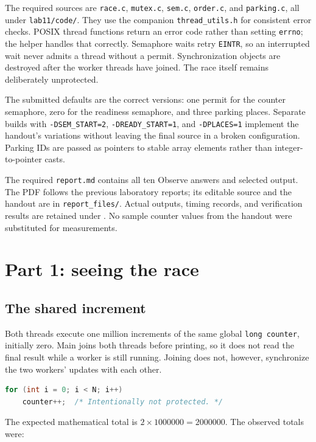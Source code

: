 \documentclass[12pt]{article}
\begin{document}
The required sources are \texttt{race.c}, \texttt{mutex.c}, \texttt{sem.c},
\texttt{order.c}, and \texttt{parking.c}, all under \texttt{lab11/code/}.
They use the companion \texttt{thread\_utils.h} for consistent error
checks. POSIX thread functions return an error code rather than setting
\texttt{errno}; the helper handles that correctly. Semaphore waits retry
\texttt{EINTR}, so an interrupted wait never admits a thread without a
permit. Synchronization objects are destroyed after the worker threads
have joined. The race itself remains deliberately unprotected.

The submitted defaults are the correct versions: one permit for the
counter semaphore, zero for the readiness semaphore, and three parking
places. Separate builds with \texttt{-DSEM\_START=2},
\texttt{-DREADY\_START=1}, and \texttt{-DPLACES=1} implement the handout's
variations without leaving the final source in a broken configuration.
Parking IDs are passed as pointers to stable array elements rather than
integer-to-pointer casts.

The required \texttt{report.md} contains all ten Observe answers and
selected output. The PDF follows the previous laboratory reports; its
editable source and the handout are in \texttt{report\_files/}. Actual
outputs, timing records, and verification results are retained under
. No sample counter values from the
handout were substituted for measurements.

\clearpage
\section{Part 1: seeing the race}
\subsection{The shared increment}
Both threads execute one million increments of the same global
\texttt{long counter}, initially zero. Main joins both threads before
printing, so it does not read the final result while a worker is still
running. Joining does not, however, synchronize the two workers' updates
with each other.
\begin{lstlisting}[language=C]
for (int i = 0; i < N; i++)
    counter++;  /* Intentionally not protected. */
\end{lstlisting}
The expected mathematical total is \(2 \times 1000000 = 2000000\).
The observed totals were:

\end{document}
